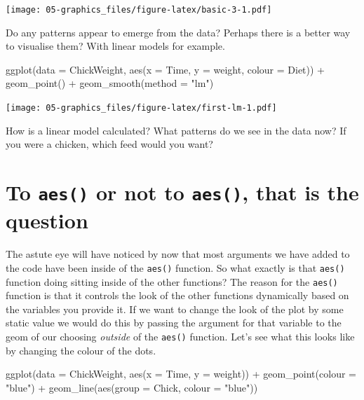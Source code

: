 \documentclass[
]{book}
\newenvironment{Shaded}{\begin{snugshade}}{\end{snugshade}}
\newcommand{\AttributeTok}[1]{\textcolor[rgb]{0.77,0.63,0.00}{#1}}
\newcommand{\FunctionTok}[1]{\textcolor[rgb]{0.00,0.00,0.00}{#1}}
\newcommand{\NormalTok}[1]{#1}
\newcommand{\SpecialCharTok}[1]{\textcolor[rgb]{0.00,0.00,0.00}{#1}}
\newcommand{\StringTok}[1]{\textcolor[rgb]{0.31,0.60,0.02}{#1}}
\begin{document}
\texttt{[image: 05-graphics\_files/figure-latex/basic-3-1.pdf]}

Do any patterns appear to emerge from the data? Perhaps there is a better way to visualise them? With linear models for example.

\begin{Shaded}
\begin{Highlighting}[]
\FunctionTok{ggplot}\NormalTok{(}\AttributeTok{data =}\NormalTok{ ChickWeight, }\FunctionTok{aes}\NormalTok{(}\AttributeTok{x =}\NormalTok{ Time, }\AttributeTok{y =}\NormalTok{ weight, }\AttributeTok{colour =}\NormalTok{ Diet)) }\SpecialCharTok{+}
  \FunctionTok{geom\_point}\NormalTok{() }\SpecialCharTok{+}
  \FunctionTok{geom\_smooth}\NormalTok{(}\AttributeTok{method =} \StringTok{"lm"}\NormalTok{)}
\end{Highlighting}
\end{Shaded}

\texttt{[image: 05-graphics\_files/figure-latex/first-lm-1.pdf]}

How is a linear model calculated? What patterns do we see in the data now? If you were a chicken, which feed would you want?

\hypertarget{to-aes-or-not-to-aes-that-is-the-question}{%
\section{\texorpdfstring{To \texttt{aes()} or not to \texttt{aes()}, that is the question}{To aes() or not to aes(), that is the question}}\label{to-aes-or-not-to-aes-that-is-the-question}}

The astute eye will have noticed by now that most arguments we have added to the code have been inside of the \texttt{aes()} function. So what exactly is that \texttt{aes()} function doing sitting inside of the other functions? The reason for the \texttt{aes()} function is that it controls the look of the other functions dynamically based on the variables you provide it. If we want to change the look of the plot by some static value we would do this by passing the argument for that variable to the geom of our choosing \emph{outside} of the \texttt{aes()} function. Let's see what this looks like by changing the colour of the dots.

\begin{Shaded}
\begin{Highlighting}[]
\FunctionTok{ggplot}\NormalTok{(}\AttributeTok{data =}\NormalTok{ ChickWeight, }\FunctionTok{aes}\NormalTok{(}\AttributeTok{x =}\NormalTok{ Time, }\AttributeTok{y =}\NormalTok{ weight)) }\SpecialCharTok{+}
  \FunctionTok{geom\_point}\NormalTok{(}\AttributeTok{colour =} \StringTok{"blue"}\NormalTok{) }\SpecialCharTok{+}
  \FunctionTok{geom\_line}\NormalTok{(}\FunctionTok{aes}\NormalTok{(}\AttributeTok{group =}\NormalTok{ Chick, }\AttributeTok{colour =} \StringTok{"blue"}\NormalTok{))}
\end{Highlighting}
\end{Shaded}
\end{document}
